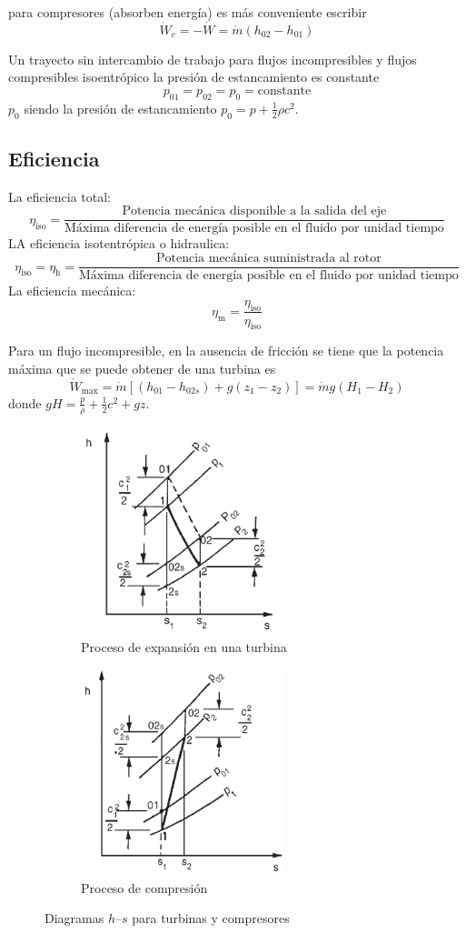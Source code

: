 \documentclass{article}
\newcommand{\substy}[2]{\ensuremath{{#1_{\mathrm{#2}}}}}
\newcommand{\cte}{\textrm{constante}}
\newcommand{\etaiso}{\eta_{\mathrm{iso}}}
\newcommand{\dW}{\dot{W}}
\newcommand{\dm}{\dot{m}}
\newcommand{\etaTot}{\substy{\eta}{iso}}
\newcommand{\etahid}{\substy{\eta}{h}}
\newcommand{\etamec}{\substy{\eta}{m}}
\begin{document}
para compresores (absorben energía) es más conveniente escribir
\[
\dW_c=-\dW =\dm \left( h_{02}-h_{01}\right)
\]

Un trayecto sin intercambio de trabajo para flujos incompresibles y flujos compresibles isoentrópico la presión de estancamiento es constante
\[
p_{01}=p_{02}=p_0=\cte
\]
$p_0$ siendo la presión de estancamiento $p_{0}=p+\tfrac{1}{2} \rho c^{2}$.
\subsection{Eficiencia}
La eficiencia total:
\[
\etaTot  = \frac{\textrm{Potencia mecánica disponible a la salida del eje}}{\textrm{Máxima diferencia de energía posible en el fluido por unidad tiempo}}
\]
LA eficiencia isotentrópica o hidraulica:
\[
\etaiso=\etahid = \frac{\textrm{Potencia mecánica suministrada al rotor}}{\textrm{Máxima diferencia de energía posible en el fluido por unidad tiempo}}
\]
La eficiencia mecánica:
\[
\etamec = \frac{\etaTot}{\etaiso}
\]

Para un flujo incompresible, en la ausencia de fricción se tiene que la potencia máxima que se puede obtener de una turbina es
\[
\dW_{\max} = \dm  \left[ (h_{01}-h_{02s})+g(z_1-z_2) \right]= \dm g \left(H_1-H_2 \right)
\]
donde $gH = \frac{p}{\rho}+\frac{1}{2}c^2+gz$.

\begin{figure}[htb!]
\centering
\begin{subfigure}{.49\textwidth}
\centering
\includegraphics[height=6cm]{fig/expansionturbina.png}
\caption{Proceso de expansión en una turbina}
\label{fig:expansiontrubina}
\end{subfigure}%
\begin{subfigure}{.49\textwidth}
\centering
\includegraphics[height= 6cm]{fig/procesocompresion.png}
\caption{Proceso de compresión }
\label{fig:procesocompresion}
\end{subfigure}
\caption{Diagramas $h$--$s$ para turbinas y compresores}
\label{fig:procesosturbomaquinasHS}
\end{figure}
\end{document}
